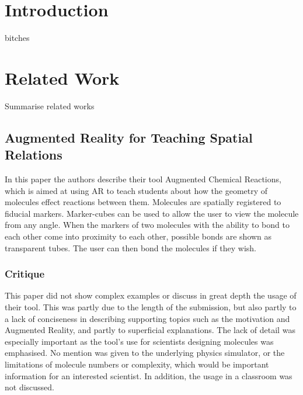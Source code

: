 \maketitle
\IEEEdisplaynotcompsoctitleabstractindextext
\IEEEpeerreviewmaketitle
\section{Introduction}

 bitches 

\section{Related Work}
Summarise related works
\subsection{Augmented Reality for Teaching Spatial Relations}
In this\cite{Maier09} paper the authors describe their tool Augmented Chemical Reactions, which is aimed at using AR to teach students about how the geometry of molecules effect reactions between them. Molecules are spatially registered to fiducial markers. Marker-cubes can be used to allow the user to view the molecule from any angle. When the markers of two molecules with the ability to bond to each other come into proximity to each other, possible bonds are shown as transparent tubes. The user can then bond the molecules if they wish.

\subsubsection{Critique}
This paper did not show complex examples or discuss in great depth the usage of their tool. This was partly due to the length of the submission, but also partly to a lack of conciseness in describing supporting topics such as the motivation and Augmented Reality, and partly to superficial explanations. The lack of detail was especially important as the tool's use for scientists designing molecules was emphasised. No mention was given to the underlying physics simulator, or the limitations of molecule numbers or complexity, which would be important information for an interested scientist. In addition, the usage in a classroom was not discussed.

